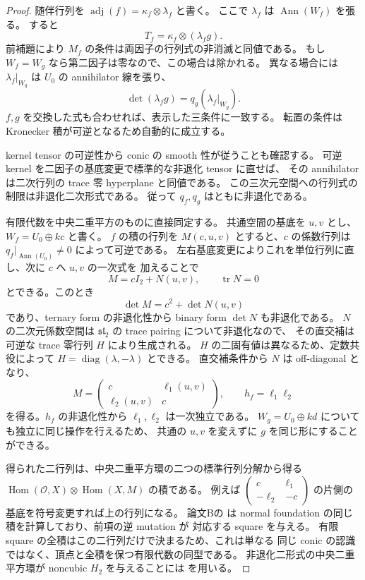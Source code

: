 \begin{proof}
随伴行列を
$\operatorname{adj}(f)=\kappa_f\otimes\lambda_f$ と書く。
ここで $\lambda_f$ は $\operatorname{Ann}(W_f)$ を張る。
すると
\[
 T_f=\kappa_f\otimes(\lambda_fg).
\]
前補題により $M_f$ の条件は両因子の行列式の非消滅と同値である。
もし $W_f=W_g$ なら第二因子は零なので、この場合は除かれる。
異なる場合には $\lambda_f|_{W_g}$ は $U_0$ の annihilator 線を張り、
\[
 \det(\lambda_fg)=q_g(\lambda_f|_{W_g}).
\]
$f,g$ を交換した式も合わせれば、表示した三条件に一致する。
転置の条件は Kronecker 積が可逆となるため自動的に成立する。

kernel tensor の可逆性から conic の smooth 性が従うことも確認する。
可逆 kernel を二因子の基底変更で標準的な非退化 tensor に直せば、
その annihilator は二次行列の trace 零 hyperplane と同値である。
この三次元空間への行列式の制限は非退化二次形式である。
従って $q_f,q_g$ はともに非退化である。

有限代数を中央二重平方のものに直接同定する。
共通空間の基底を $u,v$ とし、$W_f=U_0\oplus kc$ と書く。
$f$ の積の行列を $M(c,u,v)$ とすると、$c$ の係数行列は
$q_f|_{\operatorname{Ann}(U_0)}\ne0$ によって可逆である。
左右基底変更によりこれを単位行列に直し、次に $c$ へ $u,v$ の一次式を
加えることで
\[
 M=cI_2+N(u,v),\qquad\operatorname{tr}N=0
\]
とできる。このとき
\[
 \det M=c^2+\det N(u,v)
\]
であり、ternary form の非退化性から binary form $\det N$ も非退化である。
$N$ の二次元係数空間は $\mathfrak{sl}_2$ の trace pairing について非退化なので、
その直交補は可逆な trace 零行列 $H$ により生成される。
$H$ の二固有値は異なるため、定数共役によって
$H=\operatorname{diag}(\lambda,-\lambda)$ とできる。
直交補条件から $N$ は off-diagonal となり、
\[
 M=\begin{pmatrix}c&\ell_1(u,v)\\\ell_2(u,v)&c\end{pmatrix},
 \qquad h_f=\ell_1\ell_2
\]
を得る。$h_f$ の非退化性から $\ell_1,\ell_2$ は一次独立である。
$W_g=U_0\oplus kd$ についても独立に同じ操作を行えるため、
共通の $u,v$ を変えずに $g$ を同じ形にすることができる。

得られた二行列は、中央二重平方環の二つの標準行列分解から得る
$\operatorname{Hom}(\mathcal O,X)\otimes\operatorname{Hom}(X,M)$ の積である。
例えば $\left(\begin{smallmatrix}c&\ell_1\\-\ell_2&-c\end{smallmatrix}\right)$
の片側の基底を符号変更すれば上の行列になる。
論文Bの\cite[\texttt{eq:nchh-plane} の直前の行列分解計算]{QuadricModuli2026}
は normal foundation の同じ積を計算しており、前項の逆 mutation が
対応する square を与える。
有限 square の全積はこの二行列だけで決まるため、これは単なる
同じ conic の認識ではなく、頂点と全積を保つ有限代数の同型である。
非退化二形式の中央二重平方環が noncubic $H_2$ を与えることには
\cite[\texttt{thm:ore-anticommuting-central},\texttt{thm:noncubic-classification}]
{QuadricIntrinsic2026} を用いる。
\end{proof}

